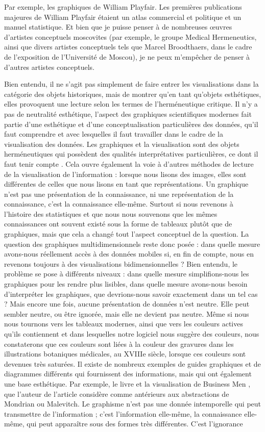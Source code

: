 \documentclass[a4paper, twoside, 12pt]{book}
\begin{document}
Par exemple, les graphiques de William Playfair. Les premières publications majeures de William Playfair étaient un atlas commercial et politique et un manuel statistique. Et bien que je puisse penser à de nombreuses œuvres d'artistes conceptuels moscovites (par exemple, le groupe Medical Hermeneutics, ainsi que divers artistes conceptuels tels que Marcel Broodthaers, dans le cadre de l'exposition de l'Université de Moscou), je ne peux m'empêcher de penser à d'autres artistes conceptuels.

Bien entendu, il ne s'agit pas simplement de faire entrer les visualisations dans la catégorie des objets historiques, mais de montrer qu'en tant qu'objets esthétiques, elles provoquent une lecture selon les termes de l'herméneutique critique. Il n'y a pas de neutralité esthétique, l'aspect des graphiques scientifiques modernes fait partie d'une esthétique et d'une conceptualisation particulières des données, qu'il faut comprendre et avec lesquelles il faut travailler dans le cadre de la visualisation des données. Les graphiques et la visualisation sont des objets herméneutiques qui possèdent des qualités interprétatives particulières, ce dont il faut tenir compte . Cela ouvre également la voie à d'autres méthodes de lecture de la visualisation de l'information : lorsque nous lisons des images, elles sont différentes de celles que nous lisons en tant que représentations. Un graphique n'est pas une présentation de la connaissance, ni une représentation de la connaissance, c'est la connaissance elle-même. Surtout si nous revenons à l'histoire des statistiques et que nous nous souvenons que les mêmes connaissances ont souvent existé sous la forme de tableaux plutôt que de graphiques, mais que cela a changé tout l'aspect conceptuel de la question. La question des graphiques multidimensionnels reste donc posée : dans quelle mesure avons-nous réellement accès à des données mobiles si, en fin de compte, nous en revenons toujours à des visualisations bidimensionnelles ? Bien entendu, le problème se pose à différents niveaux : dans quelle mesure simplifions-nous les graphiques pour les rendre plus lisibles, dans quelle mesure avons-nous besoin d'interpréter les graphiques, que devrions-nous savoir exactement dans un tel cas ? Mais encore une fois, aucune présentation de données n'est neutre. Elle peut sembler neutre, ou être ignorée, mais elle ne devient pas neutre. Même si nous nous tournons vers les tableaux modernes, ainsi que vers les couleurs actives qu'ils contiennent et dans lesquelles notre logiciel nous suggère des couleurs, nous constaterons que ces couleurs sont liées à la couleur des gravures dans les illustrations botaniques médicales, au XVIIIe siècle, lorsque ces couleurs sont devenues très saturées. Il existe de nombreux exemples de guides graphiques et de diagrammes différents qui fournissent des informations, mais qui ont également une base esthétique. Par exemple, le livre et la visualisation de Business Men , que l'auteur de l'article considère comme antérieurs aux abstractions de Mondrian ou Malevitch. Le graphisme n'est pas une donnée intemporelle qui peut transmettre de l'information ; c'est l'information elle-même, la connaissance elle-même, qui peut apparaître sous des formes très différentes. C'est l'ignorance 
\end{document}
